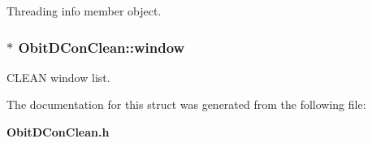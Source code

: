 Threading info member object. 

\subsubsection{$\ast$ {\bf Obit\-DCon\-Clean::window}}\label{structObitDConClean_o9}


CLEAN window list. 



The documentation for this struct was generated from the following file:\begin{CompactItemize}
\item 
{\bf Obit\-DCon\-Clean.h}\end{CompactItemize}
